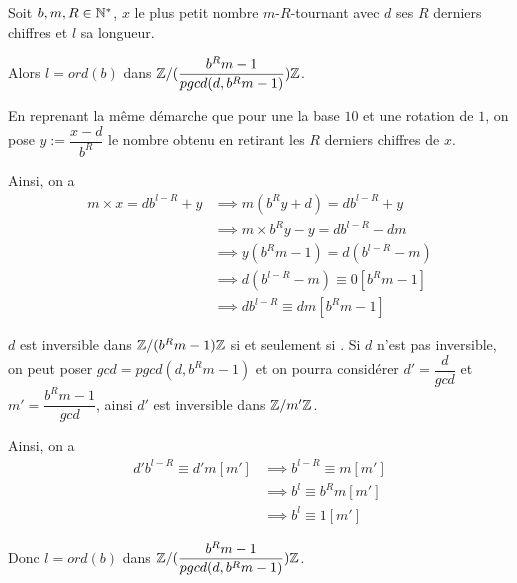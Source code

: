 \documentclass[a4paper,12pt]{article}
\begin{document}
\begin{theoreme}{}{}
    Soit $b, m, R \in \mathbb{N}^*$, $x$ le plus petit nombre $m$-$R$-tournant avec $d$ ses $R$ derniers chiffres et $l$ sa longueur.

    Alors $l = ord(b)$ dans $\mathbb{Z}/(\dfrac{b^R m - 1}{pgcd(d, b^R m - 1)})\mathbb{Z}$.
\end{theoreme}

\begin{demonstration}
    En reprenant la même démarche que pour une la base $10$ et une rotation de $1$, on pose $y := \dfrac{x - d}{b^R}$ le nombre obtenu en retirant les $R$ derniers chiffres de $x$.

    Ainsi, on a
    \begin{align*}
        m \times x = d b^{l - R} + y &\implies m(b^R y + d) = d b^{l - R} + y \\
        &\implies m \times b^R y - y = d b^{l - R} - dm \\
        &\implies y(b^R m - 1) = d(b^{l - R} - m) \\
        &\implies d(b^{l - R} - m) \equiv 0 [b^R m - 1] \\
        &\implies d b^{l - R} \equiv dm [b^R m - 1]
    \end{align*}

    $d$ est inversible dans $\mathbb{Z}/(b^R m - 1)\mathbb{Z}$ si et seulement si .
    Si $d$ n'est pas inversible, on peut poser $gcd = pgcd(d, b^R m - 1)$ et on pourra considérer $d' = \dfrac{d}{gcd}$ et $m' = \dfrac{b^R m - 1}{gcd}$, ainsi $d'$ est inversible dans $\mathbb{Z}/m'\mathbb{Z}$.

    Ainsi, on a
    \begin{align*}
        d' b^{l - R} \equiv d'm [m'] &\implies b^{l - R} \equiv m [m'] \\
        &\implies b^l \equiv b^R m [m'] \\
        &\implies b^l \equiv 1 [m']
    \end{align*}

    Donc $l = ord(b)$ dans $\mathbb{Z}/(\dfrac{b^R m - 1}{pgcd(d, b^R m - 1)})\mathbb{Z}$.
\end{demonstration}
\end{document}
